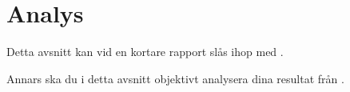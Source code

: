 \chapter{Analys}
\label{ch:analysis}
\noindent
Detta avsnitt kan vid en kortare rapport slås ihop med 
.

Annars ska du i detta avsnitt objektivt analysera dina resultat från 
.
